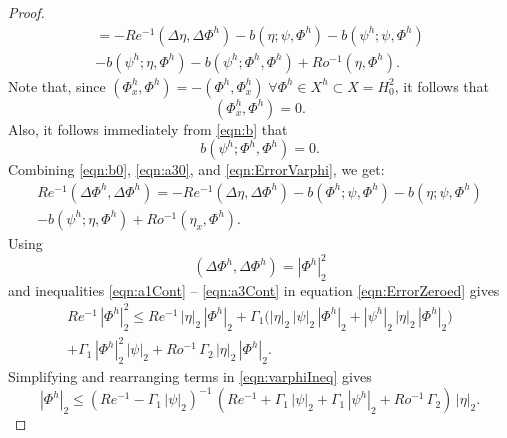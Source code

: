 \begin{proof}
\begin{equation}
\begin{split}
        = -Re^{-1} (\Delta \eta, \Delta \Phi^h)
        - b(\eta;\psi,\Phi^h) - b(\psi^h;\psi,\Phi^h) \\
      - b(\psi^h;\eta,\Phi^h) - b(\psi^h;\Phi^h,\Phi^h)
        + Ro^{-1} (\eta,\Phi^h).
    \end{split}
    \label{eqn:ErrorVarphi}
  \end{equation}
  Note that, since $(\Phi^h_x,\Phi^h)=-(\Phi^h,\Phi^h_x)\; \forall
  \Phi^h \in X^h \subset X = H^2_0$, it follows that
  \begin{equation}
    (\Phi^h_x,\Phi^h)=0 .
    \label{eqn:a30}
  \end{equation}
  Also, it follows immediately from \eqref{eqn:b} that
  \begin{equation}
    b(\psi^h;\Phi^h,\Phi^h)=0 .
    \label{eqn:b0}
  \end{equation}
  Combining \eqref{eqn:b0}, \eqref{eqn:a30}, and \eqref{eqn:ErrorVarphi}, we get:
  \begin{equation}
    \begin{split}
      Re^{-1} (\Delta \Phi^h, \Delta \Phi^h) = -Re^{-1} (\Delta \eta, \Delta \Phi^h)
        - b(\Phi^h;\psi,\Phi^h) - b(\eta;\psi,\Phi^h) \\
      - b(\psi^h;\eta,\Phi^h) + Ro^{-1} (\eta_x,\Phi^h).
    \end{split}
    \label{eqn:ErrorZeroed}
  \end{equation}
  Using
  \begin{equation*}
    (\Delta \Phi^h, \Delta \Phi^h) = |\Phi^h|^2_2
  \end{equation*}
  and inequalities \eqref{eqn:a1Cont} -- \eqref{eqn:a3Cont} in equation
  \eqref{eqn:ErrorZeroed} gives
  \begin{equation}
    \begin{split}
      Re^{-1} \, |\Phi^h|^2_2 \le Re^{-1} \,  |\eta|_2 \, |\Phi^h|_2 + \Gamma_1
        \biggl( |\eta|_2 \, |\psi|_2 \, |\Phi^h|_2 + |\psi^h|_2 \, |\eta|_2 \,
          |\Phi^h|_2 \biggr) \\
      + \Gamma_1 \, |\Phi^h|^2_2 \, |\psi|_2 + Ro^{-1}\, \Gamma_2 \, |\eta|_2 \, |\Phi^h|_2 .
    \end{split}
    \label{eqn:varphiIneq}
  \end{equation}
  Simplifying and rearranging terms in \eqref{eqn:varphiIneq} gives
  \begin{equation}
      |\Phi^h|_2 \le \left( Re^{-1} - \Gamma_1 \, | \psi |_2 \right)^{-1} \,
        \left( Re^{-1} + \Gamma_1 \, |\psi|_2 + \Gamma_1 \, |\psi^h|_2 +
        Ro^{-1}\, \Gamma_2 \right) \, |\eta|_2 .

\end{equation}
\end{proof}
